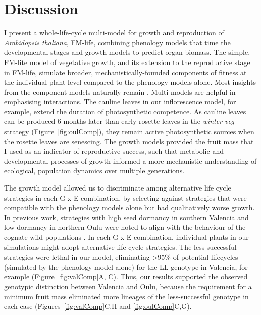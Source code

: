 \section{Discussion}
\label{discussion}

I present a whole-life-cycle multi-model for growth and reproduction of
\emph{Arabidopsis thaliana}, FM-life, combining phenology models that time the
developmental stages and growth models to predict organ biomass. The simple,
FM-lite model of vegetative growth, and its extension to the reproductive stage
in FM-life, simulate broader, mechanistically-founded components of fitness at
the individual plant level compared to the phenology models alone. Most insights
from the component models naturally remain
\citep{rasse_leaf_2006,christophe_model-based_2008,
  wilczek_effects_2009,burghardt_modeling_2015}. Multi-models are helpful in
emphasising interactions. The cauline leaves in our inflorescence model, for
example, extend the duration of photosynthetic competence. As cauline leaves can
be produced 6 months later than early rosette leaves in the \emph{winter-veg}
strategy (Figure~\ref{fig:oulComp}), they remain active photosynthetic sources
\citep{earley_inflorescences_2009, leonardos_photosynthetic_2014} when the
rosette leaves are senescing. The growth models provided the fruit mass that I
used as an indicator of reproductive success, such that metabolic and
developmental processes of growth informed a more mechanistic understanding of
ecological, population dynamics over multiple generations.

The growth model allowed us to discriminate among alternative life cycle
strategies in each G x E combination, by selecting against strategies that were
compatible with the phenology models alone but had qualitatively worse
growth. In previous work, strategies with high seed dormancy in southern
Valencia and low dormancy in northern Oulu were noted to align with the
behaviour of the cognate wild populations \citep{atwell_genome-wide_2010,
  chiang_dog1_2011, mendez-vigo_altitudinal_2011, burghardt_data_2014}. In each
G x E combination, individual plants in our simulations might adopt alternative
life cycle strategies. The less-successful strategies were lethal in our model,
eliminating \textgreater{}95\% of potential lifecycles (simulated by the
phenology model alone) for the LL genotype in Valencia, for example
(Figure~\ref{fig:valComp}A, C). Thus, our results supported the observed
genotypic distinction between Valencia and Oulu, because the requirement for a
minimum fruit mass eliminated more lineages of the less-successful genotype in
each case (Figures~\ref{fig:valComp}C,H and \ref{fig:oulComp}C,G).

